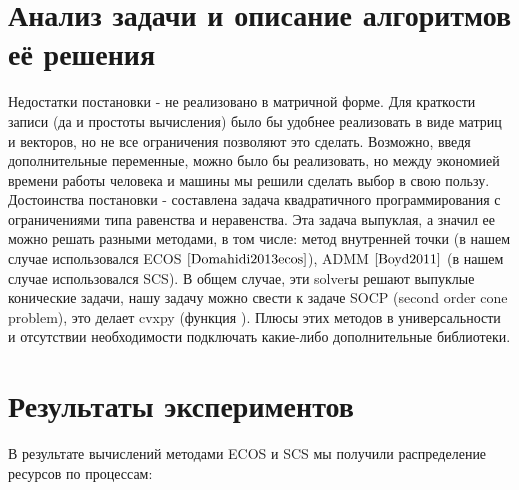 \documentclass{article}
\begin{document}
\section{Анализ задачи и описание алгоритмов её решения}

Недостатки постановки - не реализовано в матричной форме. Для краткости записи (да и простоты вычисления) было бы удобнее реализовать в виде матриц и векторов, но не все ограничения позволяют это сделать. Возможно, введя дополнительные переменные, можно было бы реализовать, но между экономией времени работы человека и машины мы решили сделать выбор в свою пользу.\\

Достоинства постановки - составлена задача квадратичного программирования с ограничениями типа равенства и неравенства. Эта задача выпуклая, а значил ее можно решать разными методами, в том числе: метод внутренней точки (в нашем случае использовался ECOS $\cite{Domahidi2013ecos}$), ADMM $\cite{Boyd2011}$ (в нашем случае использовался SCS). В общем случае, эти solverы решают выпуклые конические задачи, нашу задачу можно свести к задаче SOCP (second order cone problem), это делает cvxpy (функция ). Плюсы этих методов в универсальности и отсутствии необходимости подключать какие-либо дополнительные библиотеки. \\


\section{Результаты экспериментов}

В результате вычислений методами ECOS и SCS мы получили распределение ресурсов по процессам:
\end{document}
